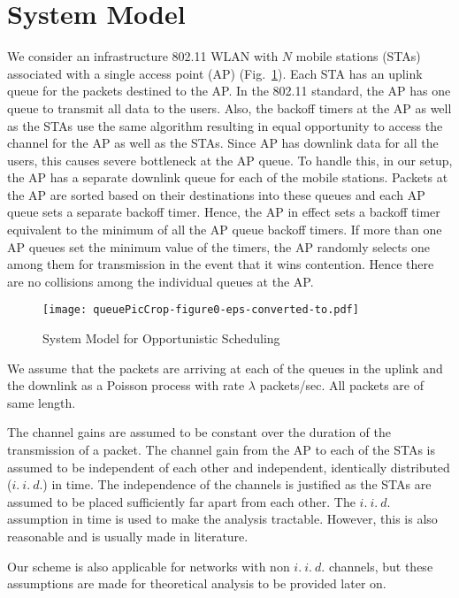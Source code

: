 \documentclass[10pt,conference]{IEEEtran}
\newcommand{\iid}{{i.~i.~d.}}
\begin{document}
\section{System Model}
\label{sec:sysmodel}



 We consider an infrastructure 802.11 WLAN with $N$ mobile stations (STAs) associated with a single access point (AP) (Fig.~\ref{fig:sys_opp}).
 Each STA has an uplink queue for the packets destined to the AP. 
In the 802.11 standard, the AP has one queue to transmit all data to the users. 
Also, the backoff timers at the AP as well as the STAs use the same algorithm resulting in equal opportunity to access the channel for the AP as well as the STAs.
Since AP has downlink data for all the users, this causes severe bottleneck at the AP queue. 
To handle this, in our setup, the AP has a separate downlink queue for each of the mobile stations.
Packets at the AP are sorted based on their destinations into these queues and each AP queue sets a separate backoff timer.
Hence, the AP in effect sets a backoff timer equivalent to the minimum of all the AP queue backoff timers. 
If more than one AP queues set the minimum value of the timers, the AP randomly selects one among them for transmission in the event that it wins contention. 
Hence there are no collisions among the individual queues at the AP.

\begin{figure}[!h]
 \centering
 \texttt{[image: queuePicCrop-figure0-eps-converted-to.pdf]}
\caption{System Model for Opportunistic Scheduling}
\label{fig:sys_opp}
\end{figure}

We assume that the packets are arriving at each of the queues in the uplink and the downlink as a Poisson process with rate $\lambda$ packets/sec. All packets are of same length.

The channel gains are assumed to be constant over the duration of the transmission of a packet.
 The channel gain from the AP to each of the STAs is assumed to be independent of each other and independent, identically distributed ($\iid$) in time. 
 The independence of the channels is justified as the STAs are assumed to be placed sufficiently far apart from each other. 
The $\iid$ assumption in time is used to make the analysis tractable. However, this is also reasonable and is usually made in literature.

Our scheme is also applicable for networks with non $\iid$ channels, but these assumptions are made for theoretical analysis to be provided later on.
\end{document}
